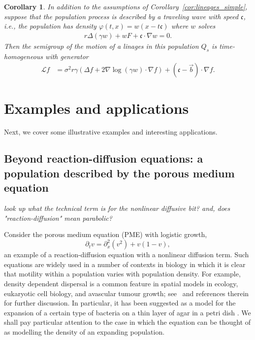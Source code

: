 \documentclass[12pt]{article}
\newtheorem{corollary}[theorem]{Corollary}
\newcommand{\grad}{\nabla}
\newcommand{\meanq}{\vec b}    %
\newcommand{\wavespeed}{\mathfrak{c}}    %
\newcommand{\Lgen}{\mathcal{L}}    %
\newcommand{\comment}[1]{{\color{blue} \it #1}}
\begin{document}
\begin{corollary} \label{cor:wavefront}
    In addition to the assumptions of Corollary~\ref{cor:lineages_simple},
    suppose that the population process is described by a traveling wave with speed $\wavespeed$,
    i.e., the population has density
    $\varphi(t, x) = w(x - t \wavespeed)$
    where $w$ solves
    \begin{align*}
        r \Delta (\gamma w) + w F + \wavespeed \cdot \grad w = 0 .
    \end{align*}
    Then the semigroup 
    of the motion of a linages in this population 
    $Q_s$ is time-homogeneous with generator
    \begin{align}
        \Lgen f
        &=
        \sigma^2 r \gamma
        \left(
            \Delta f
            +
            2 \grad \log (\gamma w)
            \cdot \grad f
        \right)
        + (\wavespeed - \meanq) \cdot \grad f .
    \end{align}
\end{corollary}


\section{Examples and applications}
\label{sec:applications}

Next,
we cover some illustrative examples
and interesting applications.

\subsection{Beyond reaction-diffusion equations: a population described by the porous medium equation}
\comment{look up what the technical term is for the nonlinear diffusive bit?
    and, does "reaction-diffusion" mean parabolic?}

Consider the porous medium equation (PME) with logistic growth,
\begin{equation}
    \label{eqn:pme}
    \partial_t v = \partial_x^2 (v^2) + v (1 - v) ,
\end{equation}
an example of a reaction-diffusion equation with a nonlinear diffusion term.
Such equations are widely used in a number of contexts in biology in which
it is clear that motility within a population varies with population density.
For example, density dependent dispersal is a common feature in spatial
models in ecology, eukaryotic cell biology, and avascular tumour growth;
see~\cite{sherratt:2010} and references therein for further discussion. 
In particular, it has been suggested as a model for
the expansion of a certain type of bacteria %
on a thin layer of agar in a petri dish 
\citep{cohen/golding/kozlovsky/benjacob/ron:1999}. 
We shall pay particular attention to the case in which the equation can be 
thought of as modelling the density of an expanding population. 
\end{document}
